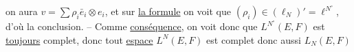 
on aura $v=\sum\rho_i\bar e_i\otimes e_i$, et sur \uline{la  formule} on voit que $(\rho_i)\in(\ell_N)'=\ell^{N^\circ}$, d'où la conclusion. -- Comme \uline{conséquence}, on voit donc que $L^{N^\circ}(E,F)$ est \uline{toujours} complet, donc tout \uline{espace} $L^N(E,F)$ est complet donc aussi $L_N(E,F)$

